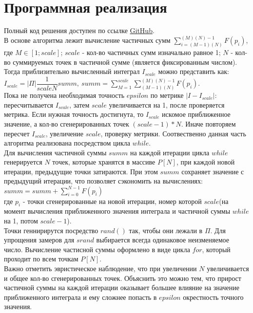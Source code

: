 \documentclass[12pt, a4paper ]{article}
\begin{document}
\section{\large Программная реализация}
Полный код решения доступен по ссылке \href{https://github.com/max181199/scmodel_2022_p2}{GitHub}. \\В основе алгоритма лежит вычисление частичных сумм $ \sum\limits_{i = (M - 1)(N)}^{(M)(N)  -  1} F(p_i)$,\\[10pt] где $M \in [1; scale]$; $scale$ - кол-во частичных сумм изначально равное 1; $N$ - кол-во суммируемых точек в частичной сумме (является фиксированным числом). \\[15pt]Тогда приблизительно вычисленный интеграл $I_{scale}$ можно представить как: \\[10pt] $I_{scale} = |\Pi|\dfrac{1}{scaleN}summ,~summ = \sum\limits_{M = 1}^{scale} \sum\limits_{(M - 1)(N)}^{(M)(N)  -  1} F(p_i)$.\\[10pt] Пока не получена необходимая точность $epsilon$ по метрике $|I - I_{scale}|$: пересчитывается $I_{scale}$, затем $scale$ увеличивается на 1, после проверяется метрика. Если нужная точность достигнута, то  $I_{scale}$ искомое приближенное значение, а кол-во сгенерированных точек ${(scale - 1) * N}$. Иначе повторяем пересчет  $I_{scale}$, увеличение $scale$, проверку метрики. Соотвественно данная часть алгоритма реализована посредством цикла $while$.\\[15pt]Для вычисления частичной суммы $summ$  на каждой итерации цикла $while$ генерируется $N$ точек, которые хранятся в массиве $P[N]$, при каждой новой итерации, предыдущие точки затираются. При этом $summ$ сохраняет значение с предыдущий итерации, что позволяет сэкономить на вычислениях:\\[10pt]  $summ = summ + \sum\limits_{i = 0}^{N  -  1} F(p_i)$ \\[10pt] где $p_i$ - точки сгенерированные на новой итерации, номер которой $scale$(на момент вычисления приближенного значения интеграла и частичной суммы $while$ на 1, потом $scale - 1$).\\[15pt] Точки геннирирутся посредство $rand()$ так, чтобы они лежали в $\Pi$. Для упрощения замеров для $srand$ выбирается всегда одинаковое неизменяемое число. Вычисление частисной суммы оформлено в виде цикла $for$, который проходит по всем точкам ${P[N]}$.\\[15pt] Важно отметить эвристическое наблюдение, что при увеличении $N$ увеличивается и общее кол-во сгенерированных точек. Объяснить это можно тем, что прирост частичной суммы на каждой итерации оказывает большее влияние на значение приближенного интеграла и ему сложнее попасть в $epsilon$ окрестность точного значения. 
\end{document}
